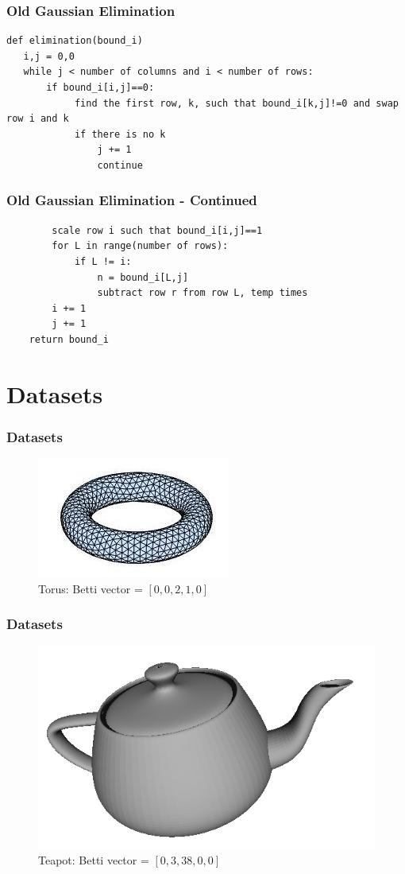 \documentclass{beamer}
\begin{document}
\begin{frame}[fragile]
\frametitle{Old Gaussian Elimination}
\begin{lstlisting}
def elimination(bound_i)
   i,j = 0,0
   while j < number of columns and i < number of rows:
       if bound_i[i,j]==0:
            find the first row, k, such that bound_i[k,j]!=0 and swap row i and k
            if there is no k
                j += 1
                continue
\end{lstlisting}
\end{frame}
\begin{frame}[fragile]
\frametitle{Old Gaussian Elimination - Continued}
\begin{lstlisting}
        scale row i such that bound_i[i,j]==1
        for L in range(number of rows):
            if L != i:
                n = bound_i[L,j]
                subtract row r from row L, temp times
        i += 1
        j += 1
    return bound_i
\end{lstlisting}
\end{frame}

\section{Datasets}
\begin{frame}
\frametitle{Datasets}
\begin{figure}
\center
\includegraphics[scale=0.5]{torus.jpg}
\caption{Torus: Betti vector = $[0,0,2,1,0]$}
\end{figure}
\end{frame}

\begin{frame}
\frametitle{Datasets}
\begin{figure}
\center
\includegraphics[scale=0.5]{teapot00.png}
\caption{Teapot: Betti vector = $[0,3,38,0,0]$}
\end{figure}
\end{frame}
\end{document}
